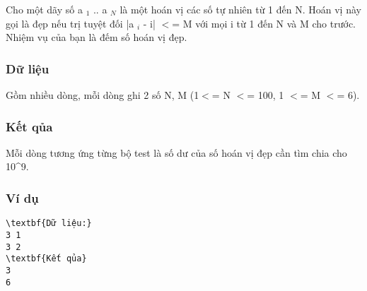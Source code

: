 



   Cho một dãy số a   $_    1   $   .. a   $_    N   $   là một hoán vị các số tự nhiên từ 1 đến N. Hoán vị này gọi là đẹp nếu trị tuyệt đối |a   $_    i   $   - i| $<$= M với mọi i từ 1 đến N và M cho trước. Nhiệm vụ của bạn là đếm số hoán vị đẹp.  

\subsubsection{   Dữ liệu  }

   Gồm nhiều dòng, mỗi dòng ghi 2 số N, M (1$<$= N $<$= 100, 1 $<$= M $<$= 6).  

\subsubsection{   Kết qủa  }

   Mỗi dòng tương ứng từng bộ test là số dư  của số hoán vị đẹp cần tìm chia cho 10\textasciicircum9.  

\subsubsection{   Ví dụ  }
\begin{verbatim}
\textbf{Dữ liệu:} 
3 1
3 2
\textbf{Kết qủa} 
3
6
\end{verbatim}